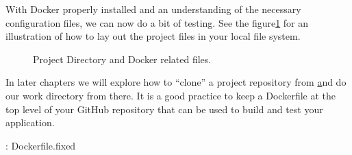 \justifying
With Docker properly installed and an understanding of the necessary configuration files, we can now do a bit of testing.
See the figure\ref{dockerdirectory} for an illustration of how to lay out the project files in your local file system.

\begin{figure}[!htb]
  \centering
  
  \caption{Project Directory and Docker related files.}
\label{dockerdirectory}
\end{figure}


\justifying
In later chapters we will explore how to ``clone'' a project repository from \href{github.com} and do our work directory
from there. It is a good practice to keep a Dockerfile at the top level of your GitHub repository that can be used to
build and test your application.


\justifying
\begin{mybox}{\thetcbcounter: Dockerfile.fixed}
    
    \label{fixeddockerfile}
\end{mybox}






